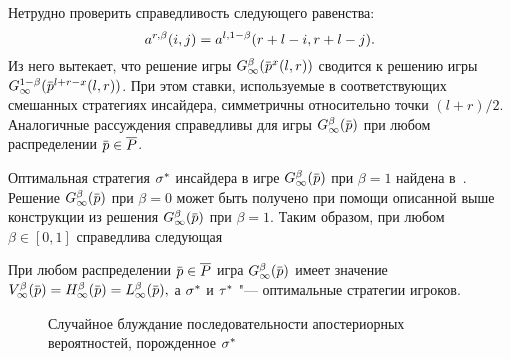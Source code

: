 {Нетрудно проверить справедливость следующего равенства:
\begin{equation*}
  \as[r](i, j) = \as[l][1-\beta](r+l-i, r+l-j).
\end{equation*}
Из него вытекает, что решение игры $\theG{\infty}(\pd^x(l, r))$ сводится к решению игры $\theG[1-\beta]{\infty}(\pd^{l+r-x}(l,r))$.
При этом ставки, используемые в соответствующих смешанных стратегиях инсайдера, симметричны относительно точки $(l+r)/2$.
Аналогичные рассуждения справедливы для игры $\theG{\infty}(\pd)$ при любом распределении $\pd \in \PM$.

Оптимальная стратегия $\sigma^*$ инсайдера в игре $\theG{\infty}(\pd)$ при $\beta = 1$ найдена в~\cite{domansky11}.
Решение $\theG{\infty}(\pd)$ при $\beta = 0$ может быть получено при помощи описанной выше конструкции из решения $\theG{\infty}(\pd)$ при $\beta = 1$.
Таким образом, при любом $\beta \in [0, 1]$ справедлива следующая
\begin{theorem}
  \label{ch2:solution:theorem}
  При любом распределении $\pd \in \PM$ игра $\theG{\infty}(\pd)$ имеет значение
  $
    \V{\infty}(\pd) = \H{\infty}(\pd) = \L{\infty}(\pd),
  $
  а $\sigma^*$ и $\tau^*$ "--- оптимальные стратегии игроков.
\end{theorem}

\begin{figure}[tbh]
  \centering
  \caption[Последовательность апостериорных вероятностей]{Случайное блуждание последовательности апостериорных вероятностей, порожденное $\sigma^*$}
  \label{ch2:fig:posterior-1}
\end{figure}

}

